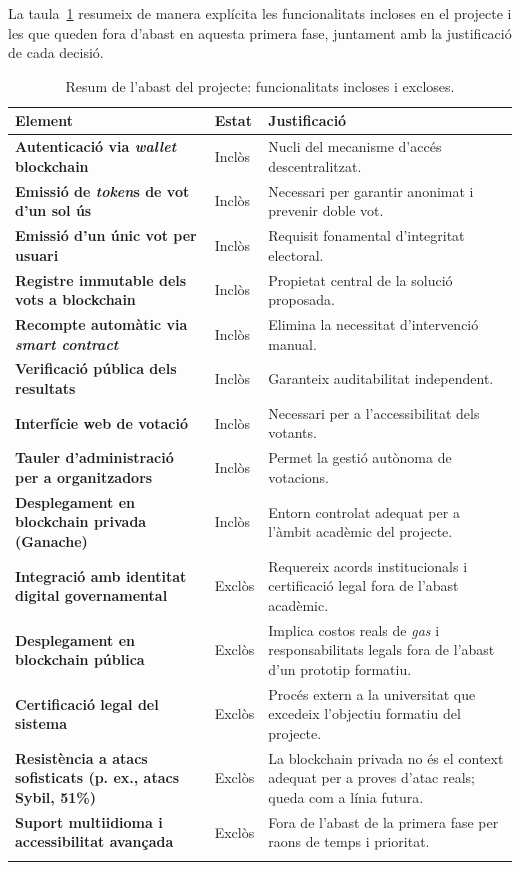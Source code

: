 \documentclass[12pt,a4paper,catalan]{article}
\begin{document}
La taula~\ref{tab:abast} resumeix de manera explícita les funcionalitats incloses en el projecte i les que queden fora d'abast en aquesta primera fase, juntament amb la justificació de cada decisió.

\begin{longtable}{|>{\bfseries}p{5cm}|p{2cm}|p{6.5cm}|}
    \hline
    \textbf{Element} & \textbf{Estat} & \textbf{Justificació} \\
    \hline
    Autenticació via \textit{wallet} blockchain & Inclòs & Nucli del mecanisme d'accés descentralitzat. \\
    \hline
    Emissió de \textit{token}s de vot d'un sol ús & Inclòs & Necessari per garantir anonimat i prevenir doble vot. \\
    \hline
    Emissió d'un únic vot per usuari & Inclòs & Requisit fonamental d'integritat electoral. \\
    \hline
    Registre immutable dels vots a blockchain & Inclòs & Propietat central de la solució proposada. \\
    \hline
    Recompte automàtic via \textit{smart contract} & Inclòs & Elimina la necessitat d'intervenció manual. \\
    \hline
    Verificació pública dels resultats & Inclòs & Garanteix auditabilitat independent. \\
    \hline
    Interfície web de votació & Inclòs & Necessari per a l'accessibilitat dels votants. \\
    \hline
    Tauler d'administració per a organitzadors & Inclòs & Permet la gestió autònoma de votacions. \\
    \hline
    Desplegament en blockchain privada (Ganache) & Inclòs & Entorn controlat adequat per a l'àmbit acadèmic del projecte. \\
    \hline
    Integració amb identitat digital governamental & Exclòs & Requereix acords institucionals i certificació legal fora de l'abast acadèmic. \\
    \hline
    Desplegament en blockchain pública & Exclòs & Implica costos reals de \textit{gas} i responsabilitats legals fora de l'abast d'un prototip formatiu. \\
    \hline
    Certificació legal del sistema & Exclòs & Procés extern a la universitat que excedeix l'objectiu formatiu del projecte. \\
    \hline
    Resistència a atacs sofisticats (p. ex., atacs Sybil, 51\%) & Exclòs & La blockchain privada no és el context adequat per a proves d'atac reals; queda com a línia futura. \\
    \hline
    Suport multiidioma i accessibilitat avançada & Exclòs & Fora de l'abast de la primera fase per raons de temps i prioritat. \\
    \hline
    \caption{Resum de l'abast del projecte: funcionalitats incloses i excloses.}
    \label{tab:abast}
\end{longtable}
\end{document}
